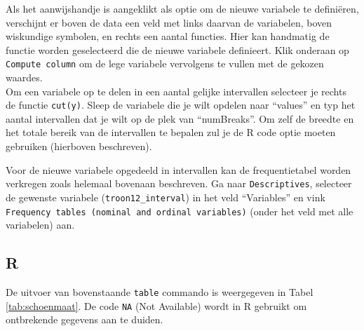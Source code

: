 \documentclass[
]{book}
\newenvironment{Shaded}{\begin{snugshade}}{\end{snugshade}}
\newcommand{\AttributeTok}[1]{\textcolor[rgb]{0.13,0.29,0.53}{#1}}
\newcommand{\CommentTok}[1]{\textcolor[rgb]{0.56,0.35,0.01}{\textit{#1}}}
\newcommand{\ConstantTok}[1]{\textcolor[rgb]{0.56,0.35,0.01}{#1}}
\newcommand{\DecValTok}[1]{\textcolor[rgb]{0.00,0.00,0.81}{#1}}
\newcommand{\FunctionTok}[1]{\textcolor[rgb]{0.13,0.29,0.53}{\textbf{#1}}}
\newcommand{\NormalTok}[1]{#1}
\newcommand{\OtherTok}[1]{\textcolor[rgb]{0.56,0.35,0.01}{#1}}
\newcommand{\SpecialCharTok}[1]{\textcolor[rgb]{0.81,0.36,0.00}{\textbf{#1}}}
\newcommand{\StringTok}[1]{\textcolor[rgb]{0.31,0.60,0.02}{#1}}
\begin{document}
Als het aanwijshandje is aangeklikt als optie om de nieuwe variabele te definiëren, verschijnt er boven de data een veld met links daarvan de variabelen, boven wiskundige symbolen, en rechts een aantal functies. Hier kan handmatig de functie worden geselecteerd die de nieuwe variabele definieert. Klik onderaan op \texttt{Compute\ column} om de lege variabele vervolgens te vullen met de gekozen waardes.\\
Om een variabele op te delen in een aantal gelijke intervallen selecteer je rechts de functie \texttt{cut(y)}. Sleep de variabele die je wilt opdelen naar ``values'' en typ het aantal intervallen dat je wilt op de plek van ``numBreaks''. Om zelf de breedte en het totale bereik van de intervallen te bepalen zul je de R code optie moeten gebruiken (hierboven beschreven).

Voor de nieuwe variabele opgedeeld in intervallen kan de frequentietabel worden verkregen zoals helemaal bovenaan beschreven. Ga naar \texttt{Descriptives}, selecteer de gewenste variabele (\texttt{troon12\_interval}) in het veld ``Variables'' en vink \texttt{Frequency\ tables\ (nominal\ and\ ordinal\ variables)} (onder het veld met alle variabelen) aan.

\subsection{R}\label{r-1}

\begin{Shaded}
\end{Shaded}

De uitvoer van bovenstaande \texttt{table} commando is weergegeven in Tabel \ref{tab:schoenmaat}.
De code \texttt{NA} (Not Available) wordt in R gebruikt om ontbrekende gegevens aan te duiden.

\begin{Shaded}
\end{Shaded}
\end{document}
